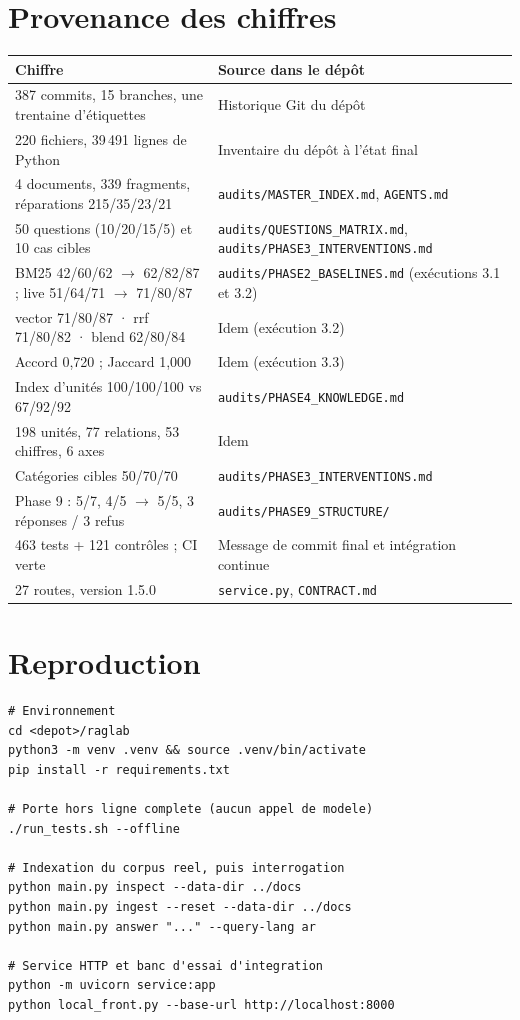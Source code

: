 \documentclass[a4paper,12pt]{report}
\begin{document}
\chapter{Provenance des chiffres}
\begin{table}[H]
\centering
\small
\begin{tabular}{p{5.6cm}p{9.0cm}}
\toprule
\textbf{Chiffre} & \textbf{Source dans le dépôt} \\
\midrule
387 commits, 15 branches, une trentaine d'étiquettes & Historique Git du dépôt \\
220 fichiers, 39\,491 lignes de Python & Inventaire du dépôt à l'état final \\
4 documents, 339 fragments, réparations 215/35/23/21 & \texttt{audits/MASTER\_INDEX.md},
\texttt{AGENTS.md} \\
50 questions (10/20/15/5) et 10 cas cibles & \texttt{audits/QUESTIONS\_MATRIX.md},
\texttt{audits/PHASE3\_INTERVENTIONS.md} \\
BM25 42/60/62 $\rightarrow$ 62/82/87 ; live 51/64/71 $\rightarrow$ 71/80/87 &
\texttt{audits/PHASE2\_BASELINES.md} (exécutions 3.1 et 3.2) \\
vector 71/80/87 · rrf 71/80/82 · blend 62/80/84 & Idem (exécution 3.2) \\
Accord 0,720 ; Jaccard 1,000 & Idem (exécution 3.3) \\
Index d'unités 100/100/100 vs 67/92/92 & \texttt{audits/PHASE4\_KNOWLEDGE.md} \\
198 unités, 77 relations, 53 chiffres, 6 axes & Idem \\
Catégories cibles 50/70/70 & \texttt{audits/PHASE3\_INTERVENTIONS.md} \\
Phase 9 : 5/7, 4/5 $\rightarrow$ 5/5, 3 réponses / 3 refus &
\texttt{audits/PHASE9\_STRUCTURE/} \\
463 tests + 121 contrôles ; CI verte & Message de commit final et intégration continue \\
27 routes, version 1.5.0 & \texttt{service.py}, \texttt{CONTRACT.md} \\
\bottomrule
\end{tabular}
\end{table}

\chapter{Reproduction}
\begin{verbatim}
# Environnement
cd <depot>/raglab
python3 -m venv .venv && source .venv/bin/activate
pip install -r requirements.txt

# Porte hors ligne complete (aucun appel de modele)
./run_tests.sh --offline

# Indexation du corpus reel, puis interrogation
python main.py inspect --data-dir ../docs
python main.py ingest --reset --data-dir ../docs
python main.py answer "..." --query-lang ar

# Service HTTP et banc d'essai d'integration
python -m uvicorn service:app
python local_front.py --base-url http://localhost:8000
\end{verbatim}
\end{document}
